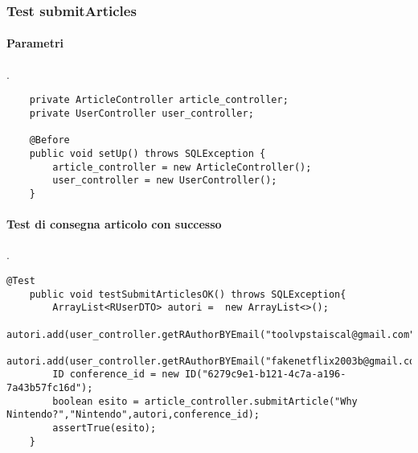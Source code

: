 \subsubsection{Test submitArticles}
\paragraph{Parametri}
.
\begin{lstlisting}
    private ArticleController article_controller;
    private UserController user_controller;

    @Before
    public void setUp() throws SQLException {
        article_controller = new ArticleController();
        user_controller = new UserController();
    }
\end{lstlisting}
\paragraph{Test di consegna articolo con successo}
.
\begin{lstlisting}
@Test
    public void testSubmitArticlesOK() throws SQLException{
        ArrayList<RUserDTO> autori =  new ArrayList<>();
        autori.add(user_controller.getRAuthorBYEmail("toolvpstaiscal@gmail.com"));
        autori.add(user_controller.getRAuthorBYEmail("fakenetflix2003b@gmail.com"));
        ID conference_id = new ID("6279c9e1-b121-4c7a-a196-7a43b57fc16d");
        boolean esito = article_controller.submitArticle("Why Nintendo?","Nintendo",autori,conference_id);
        assertTrue(esito);
    }
\end{lstlisting}
